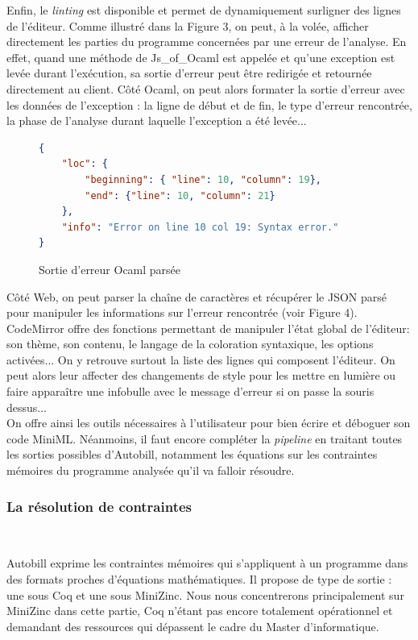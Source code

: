 \documentclass[12pt]{article}
\begin{document}
Enfin, le \textit{linting} est disponible et permet de dynamiquement surligner des lignes de l'éditeur. Comme illustré dans la Figure 3, on peut, à la volée, afficher directement les parties du programme concernées par une erreur de l'analyse. En effet, quand une méthode de Js\_of\_Ocaml est appelée et qu'une exception est levée durant l'exécution, sa sortie d'erreur peut être redirigée et retournée directement au client. Côté Ocaml, on peut alors formater la sortie d'erreur avec les données de l'exception : la ligne de début et de fin, le type d'erreur rencontrée, la phase de l'analyse durant laquelle l'exception a été levée... \\
\begin{figure}
      \centering
      \begin{lstlisting}[language=json,firstnumber=1]
{
    "loc": {
        "beginning": { "line": 10, "column": 19},
        "end": {"line": 10, "column": 21}
    },
    "info": "Error on line 10 col 19: Syntax error."
}
\end{lstlisting}
      \caption{Sortie d'erreur Ocaml parsée}
\end{figure}

Côté Web, on peut parser la chaîne de caractères et récupérer le JSON parsé pour manipuler les informations sur l'erreur rencontrée (voir Figure 4). CodeMirror offre des fonctions permettant de manipuler l'état global de l'éditeur: son thème, son contenu, le langage de la coloration syntaxique, les options activées... On y retrouve surtout la liste des lignes qui composent l'éditeur. On peut alors leur affecter des changements de style pour les mettre en lumière ou faire apparaître une infobulle avec le message d'erreur si on passe la souris dessus... \\

On offre ainsi les outils nécessaires à l'utilisateur pour bien écrire et déboguer son code MiniML. Néanmoins, il faut encore compléter la \textit{pipeline} en traitant toutes les sorties possibles d'Autobill, notamment les équations sur les contraintes mémoires du programme analysée qu'il va falloir résoudre.

\subsubsection{La résolution de contraintes}\

Autobill exprime les contraintes mémoires qui s'appliquent à un programme dans des formats proches d'équations mathématiques. Il propose de type de sortie : une sous Coq et une sous MiniZinc. Nous nous concentrerons principalement sur MiniZinc dans cette partie, Coq n'étant pas encore totalement opérationnel et demandant des ressources qui dépassent le cadre du Master d'informatique. \\
\end{document}
